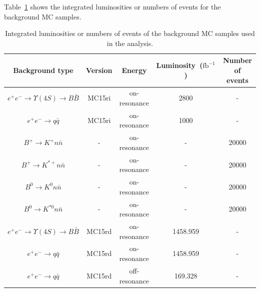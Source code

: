 Table~\ref{tab:MC_background} shows the integrated luminosities or numbers of events for the background MC samples.
\begin{table}
    \caption{Integrated luminosities or numbers of events of the background MC samples used in the analysis.}
    \centering
    \begin{tabular}{ p{5cm} p{5cm} p{5cm} p{5cm} p{5cm}  }
    \hline
    \hline
    \multicolumn{1}{c}{Background type} & \multicolumn{1}{c}{Version} & \multicolumn{1}{c}{Energy} & \multicolumn{1}{c}{Luminosity~($\textrm{fb}^{-1}$)} & \multicolumn{1}{c}{Number of events} \\
    \hline
    \multicolumn{1}{c}{$e^{+}e^{-}\to \Upsilon(4S) \to B\bar{B}$} & \multicolumn{1}{c}{MC15ri} & \multicolumn{1}{c}{on-resonance} & \multicolumn{1}{c}{2800} & \multicolumn{1}{c}{-}\\
    \multicolumn{1}{c}{$e^{+}e^{-} \to q\bar{q}$} & \multicolumn{1}{c}{MC15ri} & \multicolumn{1}{c}{on-resonance} & \multicolumn{1}{c}{1000} & \multicolumn{1}{c}{-}\\
    \multicolumn{1}{c}{$B^{+}\to K^{+}n\bar{n}$} & \multicolumn{1}{c}{-} & \multicolumn{1}{c}{on-resonance} & \multicolumn{1}{c}{-} & \multicolumn{1}{c}{20000}\\
    \multicolumn{1}{c}{$B^{+}\to K^{*+}n\bar{n}$} & \multicolumn{1}{c}{-} & \multicolumn{1}{c}{on-resonance} & \multicolumn{1}{c}{-} & \multicolumn{1}{c}{20000}\\
    \multicolumn{1}{c}{$B^{0}\to K^{0}n\bar{n}$} & \multicolumn{1}{c}{-} & \multicolumn{1}{c}{on-resonance} & \multicolumn{1}{c}{-} & \multicolumn{1}{c}{20000}\\
    \multicolumn{1}{c}{$B^{0}\to K^{*0}n\bar{n}$} & \multicolumn{1}{c}{-} & \multicolumn{1}{c}{on-resonance} & \multicolumn{1}{c}{-} & \multicolumn{1}{c}{20000}\\
    \multicolumn{1}{c}{$e^{+}e^{-}\to \Upsilon(4S) \to B\bar{B}$} & \multicolumn{1}{c}{MC15rd} & \multicolumn{1}{c}{on-resonance} & \multicolumn{1}{c}{1458.959} & \multicolumn{1}{c}{-}\\
    \multicolumn{1}{c}{$e^{+}e^{-} \to q\bar{q}$} & \multicolumn{1}{c}{MC15rd} & \multicolumn{1}{c}{on-resonance} & \multicolumn{1}{c}{1458.959} & \multicolumn{1}{c}{-}\\
    \multicolumn{1}{c}{$e^{+}e^{-} \to q\bar{q}$} & \multicolumn{1}{c}{MC15rd} & \multicolumn{1}{c}{off-resonance} & \multicolumn{1}{c}{169.328} & \multicolumn{1}{c}{-}\\
  \hline
  \hline
\end{tabular}
    \label{tab:MC_background}
\end{table}

